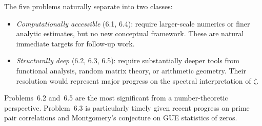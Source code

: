 \documentclass[12pt,a4paper]{amsart}
\theoremstyle{definition}
\begin{document}
\noindent
The five problems naturally separate into two classes:
\begin{itemize}
\item \emph{Computationally accessible} (6.1, 6.4):
require larger-scale numerics or finer analytic estimates,
but no new conceptual framework.
These are natural immediate targets for follow-up work.
\item \emph{Structurally deep} (6.2, 6.3, 6.5):
require substantially deeper tools from functional analysis,
random matrix theory, or arithmetic geometry.
Their resolution would represent major progress on the
spectral interpretation of $\zeta$.
\end{itemize}
Problems~6.2 and~6.5 are the most significant from a
number-theoretic perspective. Problem~6.3 is particularly timely
given recent progress on prime pair correlations
\cite{GoldstonMontgomery1987} and Montgomery's conjecture on
GUE statistics of zeros.
\end{document}
